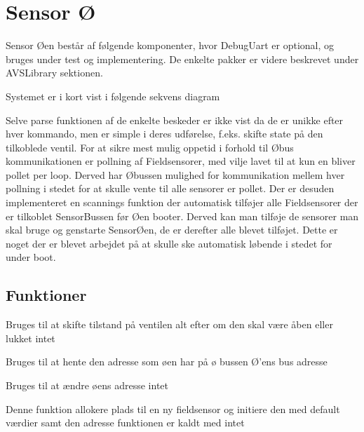 \section{Sensor Ø}

Sensor Øen består af følgende komponenter, 
hvor DebugUart er optional, og bruges under 
test og implementering. De enkelte pakker er 
videre beskrevet under AVSLibrary sektionen.


Systemet er i kort vist i følgende sekvens diagram


Selve parse funktionen af de enkelte beskeder er ikke 
vist da de er unikke efter hver kommando, men er simple 
i deres udførelse, f.eks. skifte state på den tilkoblede 
ventil. For at sikre mest mulig oppetid i forhold til 
Øbus kommunikationen er pollning af Fieldsensorer, med 
vilje lavet til at kun en bliver pollet per loop. Derved 
har Øbussen mulighed for kommunikation mellem hver pollning 
i stedet for at skulle vente til alle sensorer er pollet. 
Der er desuden implementeret en scannings funktion der 
automatisk tilføjer alle Fieldsensorer der er tilkoblet 
SensorBussen før Øen booter. Derved kan man tilføje de 
sensorer man skal bruge og genstarte SensorØen, de er 
derefter alle blevet tilføjet. Dette er noget der er 
blevet arbejdet på at skulle ske automatisk løbende i 
stedet for under boot.

\subsection{Funktioner}

{Bruges til at skifte tilstand på ventilen alt efter om den skal være åben eller lukket}
{intet}
{
}

{Bruges til at hente den adresse som øen har på ø bussen}
{Ø'ens bus adresse}
{
}

{Bruges til at ændre øens adresse}
{intet}
{
}

{Denne funktion allokere plads til en ny fieldsensor og initiere den med default værdier samt den adresse funktionen er kaldt med}
{intet}
{
}


